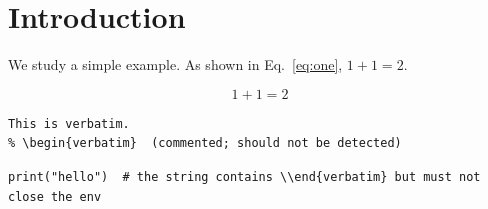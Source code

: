 \documentclass{article}
\begin{document}
\section{Introduction}
\label{sec:intro}

We study a simple example. As shown in Eq.~\eqref{eq:one}, $1+1=2$.

\begin{equation}
1+1=2
\label{eq:one}
\end{equation}

\begin{verbatim}
This is verbatim.
% \begin{verbatim}  (commented; should not be detected)
\end{verbatim}

\begin{verbatim}
print("hello")  # the string contains \\end{verbatim} but must not close the env
\end{verbatim}
\end{document}
